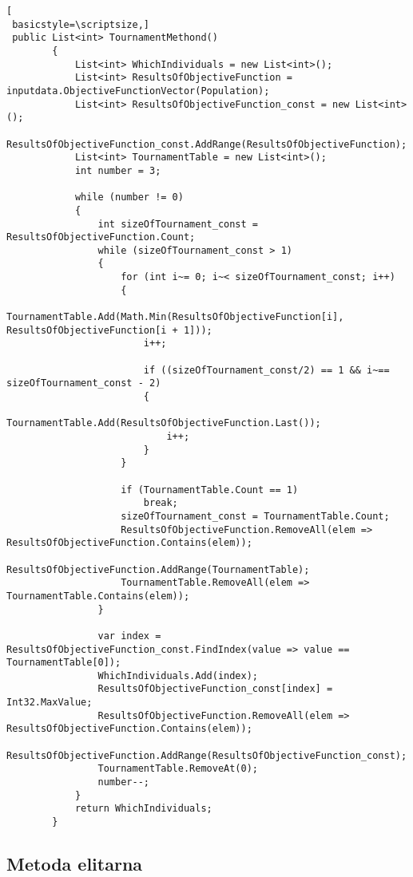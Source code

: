\begin{lstlisting}[
 basicstyle=\scriptsize,]
 public List<int> TournamentMethond()
        {
            List<int> WhichIndividuals = new List<int>();
            List<int> ResultsOfObjectiveFunction = inputdata.ObjectiveFunctionVector(Population);
            List<int> ResultsOfObjectiveFunction_const = new List<int>();
            ResultsOfObjectiveFunction_const.AddRange(ResultsOfObjectiveFunction);
            List<int> TournamentTable = new List<int>();
            int number = 3;

            while (number != 0)
            {
                int sizeOfTournament_const = ResultsOfObjectiveFunction.Count;
                while (sizeOfTournament_const > 1)
                {
                    for (int i~= 0; i~< sizeOfTournament_const; i++)
                    {
                        TournamentTable.Add(Math.Min(ResultsOfObjectiveFunction[i], ResultsOfObjectiveFunction[i + 1]));
                        i++;

                        if ((sizeOfTournament_const/2) == 1 && i~== sizeOfTournament_const - 2)
                        {
                            TournamentTable.Add(ResultsOfObjectiveFunction.Last());
                            i++;
                        }
                    }

                    if (TournamentTable.Count == 1)
                        break;
                    sizeOfTournament_const = TournamentTable.Count;
                    ResultsOfObjectiveFunction.RemoveAll(elem => ResultsOfObjectiveFunction.Contains(elem));
                    ResultsOfObjectiveFunction.AddRange(TournamentTable);
                    TournamentTable.RemoveAll(elem => TournamentTable.Contains(elem));
                }

                var index = ResultsOfObjectiveFunction_const.FindIndex(value => value == TournamentTable[0]);
                WhichIndividuals.Add(index);
                ResultsOfObjectiveFunction_const[index] = Int32.MaxValue;
                ResultsOfObjectiveFunction.RemoveAll(elem => ResultsOfObjectiveFunction.Contains(elem));
                ResultsOfObjectiveFunction.AddRange(ResultsOfObjectiveFunction_const);
                TournamentTable.RemoveAt(0);
                number--;
            }
            return WhichIndividuals;
        }
\end{lstlisting}

\subsection*{Metoda elitarna}

